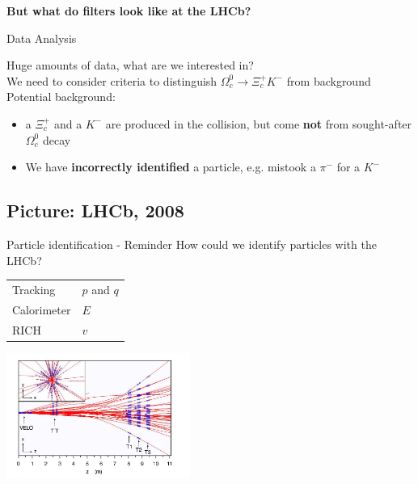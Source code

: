 \begin{frame}

\LARGE \textbf{But what do filters look like at the LHCb?}
    
\end{frame}
\begin{frame}{Data Analysis}

Huge amounts of data, what are we interested in?\\ %
\vspace{0.2cm}
 We need to consider criteria to distinguish $\Omega_c^0 \rightarrow \Xi_c^+ K^-$ from background\\%
\vspace{0.5cm}
Potential background: 
\begin{itemize}
    \item a $\Xi_c^+$ and a $K^-$ are produced in the collision, but come \textbf{not} from sought-after $\Omega_c^0$ decay%
    \item We have \textbf{incorrectly identified} a particle, e.g. mistook a $\pi^-$ for a $K^-$
\end{itemize}
\end{frame}
\subsection{Picture: LHCb, 2008}
\begin{frame}{Particle identification - Reminder}
How could we identify particles with the LHCb? \\
\vspace{0.5cm}
\begin{center}
    \begin{tabular}{ll}
    Tracking &  $p$ and $q$\\
    Calorimeter & $E$ \\
    RICH & $v$ \\
\end{tabular}
\end{center}

\vspace{0.5cm}
\begin{center}
    \includegraphics[width = 0.45\textwidth]{Figures Lecture on Datanalysis/2D-Eventdisplay.png}
\end{center}  
\end{frame}

